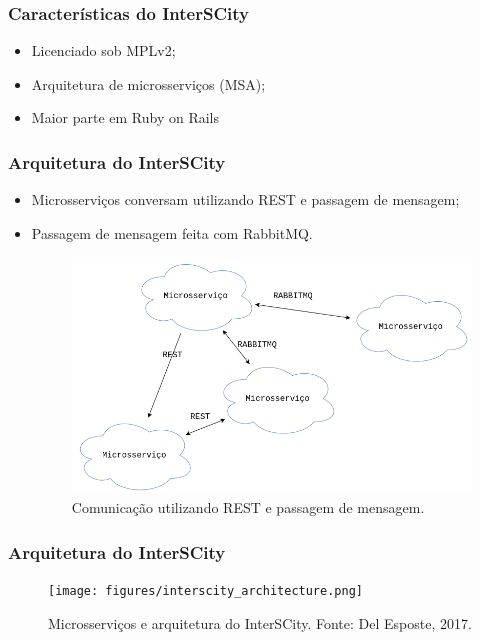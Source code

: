 \documentclass{beamer}
\begin{document}
    \begin{frame}
        \frametitle{Características do InterSCity}
        \begin{itemize}
            \item Licenciado sob MPLv2;
            \item Arquitetura de microsserviços (MSA);
            \item Maior parte em Ruby on Rails
        \end{itemize}
    \end{frame}

    \begin{frame}
        \frametitle{Arquitetura do InterSCity}
        \begin{itemize}
            \item Microsserviços conversam utilizando REST e passagem de mensagem;
            \item Passagem de mensagem feita com RabbitMQ.
                \begin{figure}
                    \includegraphics[scale=0.3]{figures/communication.png}
                    \caption{Comunicação utilizando REST e passagem de mensagem.}
                \end{figure}
        \end{itemize}
    \end{frame}

    \begin{frame}
        \frametitle{Arquitetura do InterSCity}
        \begin{figure}
            \texttt{[image: figures/interscity\_architecture.png]}
            \caption{Microsserviços e arquitetura do InterSCity. Fonte: Del Esposte, 2017.}
        \end{figure}
    \end{frame}
\end{document}
